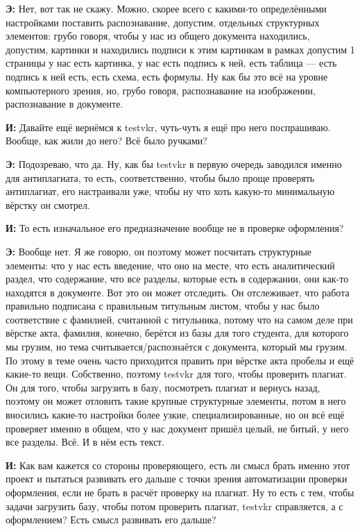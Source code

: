 \textbf{Э: }Нет, вот так не скажу. Можно, скорее всего с какими-то определёнными настройками поставить распознавание, допустим, отдельных структурных элементов: грубо говоря, чтобы у нас из общего документа находились, допустим, картинки и находились подписи к этим картинкам в рамках допустим 1 страницы у нас есть картинка, у нас есть подпись к ней, есть таблица --- есть подпись к ней есть, есть схема, есть формулы. Ну как бы это всё на уровне компьютерного зрения, но, грубо говоря, распознавание на изображении, распознавание в документе.

\textbf{И: }Давайте ещё вернёмся к testvkr, чуть-чуть я ещё про него поспрашиваю. Вообще, как жили до него? Всё было ручками?

\textbf{Э: }Подозреваю, что да. Ну, как бы testvkr в первую очередь заводился именно для антиплагиата, то есть, соответственно, чтобы было проще проверять антиплагиат, его настраивали уже, чтобы ну что хоть какую-то минимальную вёрстку он смотрел.

\textbf{И: }То есть изначальное его предназначение вообще не в проверке оформления?

\textbf{Э: }Вообще нет. Я же говорю, он поэтому может посчитать структурные элементы: что у нас есть введение, что оно на месте, что есть аналитический раздел, что содержание, что все разделы, которые есть в содержании, они как-то находятся в документе. Вот это он может отследить. Он отслеживает, что работа правильно подписана с правильным титульным листом, чтобы у нас было соответствие с фамилией, считанной с титульника, потому что на самом деле при вёрстке акта, фамилия, конечно, берётся из базы для того студента, для которого мы грузим, но тема считывается/распознаётся с документа, который мы грузим. По этому в теме очень часто приходится править при вёрстке акта пробелы и ещё какие-то вещи. Собственно, поэтому testvkr для того, чтобы проверить плагиат. Он для того, чтобы загрузить в базу, посмотреть плагиат и вернусь назад, поэтому он может отловить такие крупные структурные элементы, потом в него вносились какие-то настройки более узкие, специализированные, но он всё ещё проверяет именно в общем, что у нас документ пришёл целый, не битый, у него все разделы. Всё. И в нём есть текст.

\textbf{И: }Как вам кажется со стороны проверяющего, есть ли смысл брать именно этот проект и пытаться развивать его дальше с точки зрения автоматизации проверки оформления, если не брать в расчёт проверку на плагиат. Ну то есть с тем, чтобы задачи загрузить базу, чтобы потом проверить плагиат, testvkr справляется, а с оформлением? Есть смысл развивать его дальше? 

